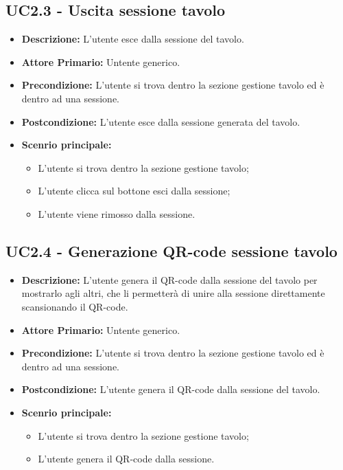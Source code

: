 \subsection{UC2.3 - Uscita sessione tavolo}
\begin{itemize}
    \item \textbf{Descrizione:} L'utente esce dalla sessione del tavolo.
    \item \textbf{Attore Primario:} Untente generico.
    \item \textbf{Precondizione:} L'utente si trova dentro la sezione gestione tavolo ed è dentro ad una sessione.
    \item \textbf{Postcondizione:} L'utente esce dalla sessione generata del tavolo.
    \item \textbf{Scenrio principale:}
    \begin{itemize}
        \item L'utente si trova dentro la sezione gestione tavolo;
        \item L'utente clicca sul bottone esci dalla sessione;
        \item L'utente viene rimosso dalla sessione.
    \end{itemize}
\end{itemize}
\subsection{UC2.4 - Generazione QR-code sessione tavolo}
\begin{itemize}
    \item \textbf{Descrizione:} L'utente genera il QR-code dalla sessione del tavolo per mostrarlo agli altri, che li permetterà di unire alla sessione direttamente scansionando il QR-code.
    \item \textbf{Attore Primario:} Untente generico.
    \item \textbf{Precondizione:} L'utente si trova dentro la sezione gestione tavolo ed è dentro ad una sessione.
    \item \textbf{Postcondizione:} L'utente genera il QR-code dalla sessione del tavolo.
    \item \textbf{Scenrio principale:}
    \begin{itemize}
        \item L'utente si trova dentro la sezione gestione tavolo;
        \item L'utente genera il QR-code dalla sessione.
    \end{itemize}
\end{itemize}



